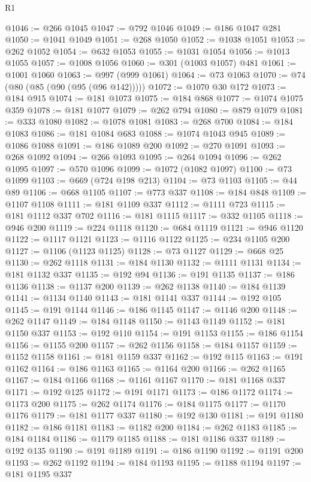 \begin{lexlean}{R1}
\begin{coremodule}
@1046 := @266 @1045
@1047 := @792 @1046
@1049 := @186 @1047 @281
@1050 := @1041 @1049
@1051 := @268 @1050
@1052 := @1038 @1051
@1053 := @262 @1052
@1054 := @632 @1053
@1055 := @1031 @1054
@1056 := @1013 @1055
@1057 := @1008 @1056
@1060 := @301 (@1003 @1057) @481
@1061 := @1001 @1060
@1063 := @997 (@999 @1061)
@1064 := @73 @1063
@1070 := @74 (@80 (@85 (@90 (@95 (@96 @142)))))
@1072 := @1070 @30 @172
@1073 := @184 @915
@1074 := @181 @1073
@1075 := @184 @868
@1077 := @1074 @1075 @359
@1078 := @181 @1077
@1079 := @262 @794
@1080 := @879 @1079
@1081 := @333 @1080
@1082 := @1078 @1081
@1083 := @268 @700
@1084 := @184 @1083
@1086 := @181 @1084 @683
@1088 := @1074 @1043 @945
@1089 := @1086 @1088
@1091 := @186 @1089 @200
@1092 := @270 @1091
@1093 := @268 @1092
@1094 := @266 @1093
@1095 := @264 @1094
@1096 := @262 @1095
@1097 := @570 @1096
@1099 := @1072 (@1082 @1097)
@1100 := @73 @1099
@1103 := @669 (@724 @198 @213)
@1104 := @73 @1103
@1105 := @44 @89
@1106 := @668 @1105
@1107 := @773 @337
@1108 := @184 @848
@1109 := @1107 @1108
@1111 := @181 @1109 @337
@1112 := @1111 @723
@1115 := @181 @1112 @337 @702
@1116 := @181 @1115
@1117 := @332 @1105
@1118 := @946 @200
@1119 := @224 @1118
@1120 := @684 @1119
@1121 := @946 @1120
@1122 := @1117 @1121
@1123 := @1116 @1122
@1125 := @234 @1105 @200
@1127 := @1106 (@1123 @1125)
@1128 := @73 @1127
@1129 := @668 @25
@1130 := @262 @1118
@1131 := @184 @1130
@1132 := @1111 @1131
@1134 := @181 @1132 @337
@1135 := @192 @94
@1136 := @191 @1135
@1137 := @186 @1136
@1138 := @1137 @200
@1139 := @262 @1138
@1140 := @184 @1139
@1141 := @1134 @1140
@1143 := @181 @1141 @337
@1144 := @192 @105
@1145 := @191 @1144
@1146 := @186 @1145
@1147 := @1146 @200
@1148 := @262 @1147
@1149 := @184 @1148
@1150 := @1143 @1149
@1152 := @181 @1150 @337
@1153 := @192 @110
@1154 := @191 @1153
@1155 := @186 @1154
@1156 := @1155 @200
@1157 := @262 @1156
@1158 := @184 @1157
@1159 := @1152 @1158
@1161 := @181 @1159 @337
@1162 := @192 @115
@1163 := @191 @1162
@1164 := @186 @1163
@1165 := @1164 @200
@1166 := @262 @1165
@1167 := @184 @1166
@1168 := @1161 @1167
@1170 := @181 @1168 @337
@1171 := @192 @125
@1172 := @191 @1171
@1173 := @186 @1172
@1174 := @1173 @200
@1175 := @262 @1174
@1176 := @184 @1175
@1177 := @1170 @1176
@1179 := @181 @1177 @337
@1180 := @192 @130
@1181 := @191 @1180
@1182 := @186 @1181
@1183 := @1182 @200
@1184 := @262 @1183
@1185 := @184 @1184
@1186 := @1179 @1185
@1188 := @181 @1186 @337
@1189 := @192 @135
@1190 := @191 @1189
@1191 := @186 @1190
@1192 := @1191 @200
@1193 := @262 @1192
@1194 := @184 @1193
@1195 := @1188 @1194
@1197 := @181 @1195 @337

\end{coremodule}
\end{lexlean}

